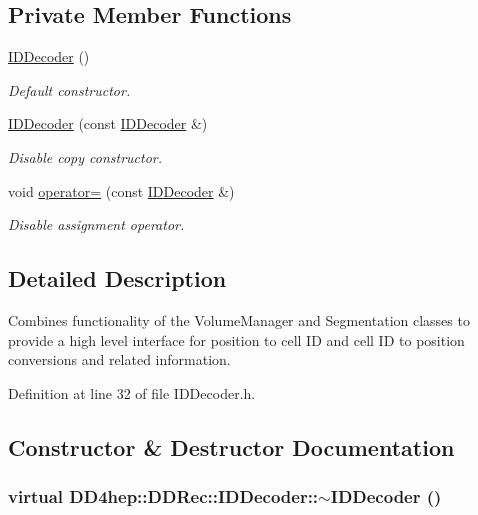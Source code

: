\subsection*{Private Member Functions}
\begin{DoxyCompactItemize}
\item 
\hyperlink{class_d_d4hep_1_1_d_d_rec_1_1_i_d_decoder_af0d078d2fd6039aadb63d113b7a83367}{IDDecoder} ()
\begin{DoxyCompactList}\small\item\em Default constructor. \item\end{DoxyCompactList}\item 
\hyperlink{class_d_d4hep_1_1_d_d_rec_1_1_i_d_decoder_a428873f9f3597175d44b1e150ebf84e8}{IDDecoder} (const \hyperlink{class_d_d4hep_1_1_d_d_rec_1_1_i_d_decoder}{IDDecoder} \&)
\begin{DoxyCompactList}\small\item\em Disable copy constructor. \item\end{DoxyCompactList}\item 
void \hyperlink{class_d_d4hep_1_1_d_d_rec_1_1_i_d_decoder_ac635e457d5748ceb74f795a6f8ad8a46}{operator=} (const \hyperlink{class_d_d4hep_1_1_d_d_rec_1_1_i_d_decoder}{IDDecoder} \&)
\begin{DoxyCompactList}\small\item\em Disable assignment operator. \item\end{DoxyCompactList}\end{DoxyCompactItemize}


\subsection{Detailed Description}
Combines functionality of the VolumeManager and Segmentation classes to provide a high level interface for position to cell ID and cell ID to position conversions and related information. 

Definition at line 32 of file IDDecoder.h.

\subsection{Constructor \& Destructor Documentation}
\hypertarget{class_d_d4hep_1_1_d_d_rec_1_1_i_d_decoder_ae33c4d2a1adca58755ef45b8d7c47571}{
\subsubsection[{$\sim$IDDecoder}]{\setlength{\rightskip}{0pt plus 5cm}virtual DD4hep::DDRec::IDDecoder::$\sim$IDDecoder ()}}
\label{class_d_d4hep_1_1_d_d_rec_1_1_i_d_decoder_ae33c4d2a1adca58755ef45b8d7c47571}


